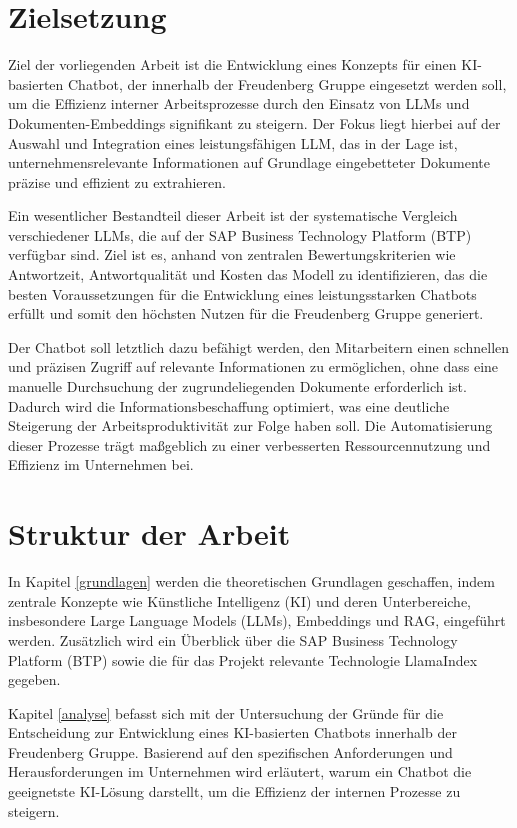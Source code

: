 \section{Zielsetzung}

Ziel der vorliegenden Arbeit ist die Entwicklung eines Konzepts für einen \ac{KI}-basierten Chatbot, der innerhalb der Freudenberg Gruppe eingesetzt werden soll, 
um die Effizienz interner Arbeitsprozesse durch den Einsatz von \acp{LLM} und Dokumenten-Embeddings signifikant zu steigern. 
Der Fokus liegt hierbei auf der Auswahl und Integration eines leistungsfähigen \ac{LLM}, das in der Lage ist, unternehmensrelevante Informationen auf Grundlage eingebetteter Dokumente präzise und effizient zu extrahieren.

Ein wesentlicher Bestandteil dieser Arbeit ist der systematische Vergleich verschiedener \acp{LLM}, die auf der SAP Business Technology Platform (\ac{BTP}) verfügbar sind. 
Ziel ist es, anhand von zentralen Bewertungskriterien wie Antwortzeit, Antwortqualität und Kosten das Modell zu identifizieren, 
das die besten Voraussetzungen für die Entwicklung eines leistungsstarken Chatbots erfüllt und somit den höchsten Nutzen für die Freudenberg Gruppe generiert.

Der Chatbot soll letztlich dazu befähigt werden, den Mitarbeitern einen schnellen und präzisen Zugriff auf relevante Informationen zu ermöglichen, 
ohne dass eine manuelle Durchsuchung der zugrundeliegenden Dokumente erforderlich ist. Dadurch wird die Informationsbeschaffung optimiert, was eine deutliche Steigerung der Arbeitsproduktivität zur Folge haben soll. 
Die Automatisierung dieser Prozesse trägt maßgeblich zu einer verbesserten Ressourcennutzung und Effizienz im Unternehmen bei.


\section{Struktur der Arbeit}

In Kapitel \ref{grundlagen} werden die theoretischen Grundlagen geschaffen, indem zentrale Konzepte wie Künstliche Intelligenz (\ac{KI}) und deren Unterbereiche, insbesondere Large Language Models (\acp{LLM}), Embeddings und \ac{RAG}, eingeführt werden.
Zusätzlich wird ein Überblick über die SAP Business Technology Platform (\ac{BTP}) sowie die für das Projekt relevante Technologie LlamaIndex gegeben.

Kapitel \ref{analyse} befasst sich mit der Untersuchung der Gründe für die Entscheidung zur Entwicklung eines \ac{KI}-basierten Chatbots innerhalb der Freudenberg Gruppe. 
Basierend auf den spezifischen Anforderungen und Herausforderungen im Unternehmen wird erläutert, warum ein Chatbot die geeignetste \ac{KI}-Lösung darstellt, um die Effizienz der internen Prozesse zu steigern. 

